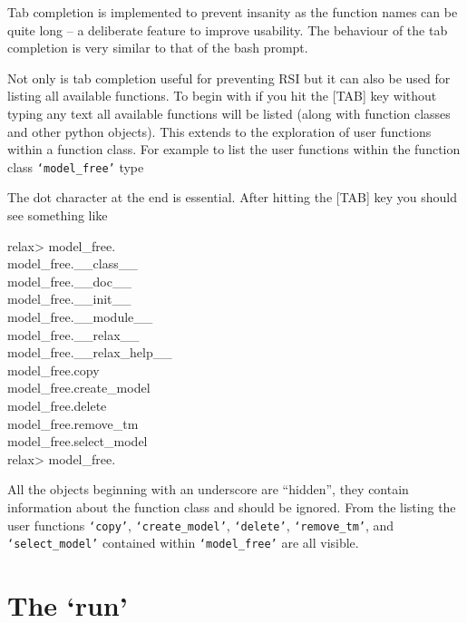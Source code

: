 Tab completion is implemented to prevent insanity as the function names can be quite long -- a deliberate feature to improve usability.  The behaviour of the tab completion is very similar to that of the bash prompt.

Not only is tab completion useful for preventing RSI but it can also be used for listing all available functions.  To begin with if you hit the [TAB] key without typing any text all available functions will be listed (along with function classes and other python objects).  This extends to the exploration of user functions within a function class.  For example to list the user functions within the function class \texttt{`model\_free'} type


The dot character at the end is essential.  After hitting the [TAB] key you should see something like

\begin{exampleenv}
relax> model\_free. \\
model\_free.\_\_class\_\_ \\
model\_free.\_\_doc\_\_ \\
model\_free.\_\_init\_\_ \\
model\_free.\_\_module\_\_ \\
model\_free.\_\_relax\_\_ \\
model\_free.\_\_relax\_help\_\_ \\
model\_free.copy \\
model\_free.create\_model \\
model\_free.delete \\
model\_free.remove\_tm \\
model\_free.select\_model \\
relax> model\_free.
\end{exampleenv}

All the objects beginning with an underscore are ``hidden'', they contain information about the function class and should be ignored.  From the listing the user functions \texttt{`copy'}, \texttt{`create\_model'}, \texttt{`delete'}, \texttt{`remove\_tm'}, and \texttt{`select\_model'} contained within \texttt{`model\_free'} are all visible.




\section{The `run'}

